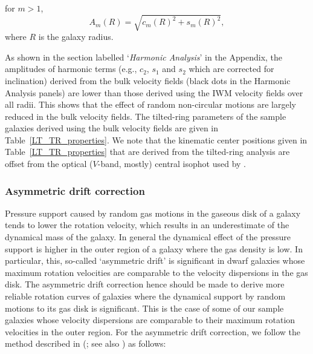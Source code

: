 \documentclass[natbib209]{emulateapj}
\begin{document}
for $m>1$,
\begin{equation}
\label{eq:2}
A_m(R)=\sqrt{c_m(R)^2+s_m(R)^2},
\end{equation}
where $R$ is the galaxy radius.

As shown in the section labelled `{\it Harmonic Analysis}' in the Appendix, the amplitudes of
harmonic terms (e.g., $c_{2}$, $s_{1}$ and $s_{2}$ which are corrected for
inclination) derived from the bulk velocity fields (black dots in the Harmonic
Analysis panels) are lower than those derived using the IWM velocity fields over
all radii. This shows that the effect of random non-circular motions are largely
reduced in the bulk velocity fields. The tilted-ring parameters of the
sample galaxies derived using the bulk velocity fields are given in
Table~\ref{LT_TR_properties}. We note that the kinematic center positions given
in Table~\ref{LT_TR_properties} that are derived from the tilted-ring analysis
are offset from the optical ($V$-band, mostly) central isophot used by
\cite{Hunter_2012}.


\subsubsection{Asymmetric drift correction} \label{ASD}

Pressure support caused by random gas motions in the gaseous disk of a galaxy tends to
lower the rotation velocity, which results in an underestimate of the dynamical
mass of the galaxy. In general the dynamical effect of the pressure support is higher in
the outer region of a galaxy where the gas density is low. In particular, this, so-called
`asymmetric drift' is significant in dwarf galaxies whose maximum rotation
velocities are comparable to the velocity dispersions in the gas disk. The
asymmetric drift correction hence should be made to derive more reliable
rotation curves of galaxies where the dynamical support by random motions to its
gas disk is significant. This is the case of some of our sample galaxies whose
velocity dispersions are comparable to their maximum rotation velocities in the
outer region. For the asymmetric drift correction, we follow the method described
in \citeauthor{Bureau_2002} (\citeyear{Bureau_2002}; see also \citeauthor{Oh_2011a} \citeyear{Oh_2011a}) as
follows:
\end{document}
